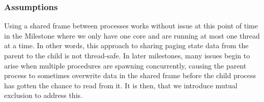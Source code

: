 \subsubsection{Assumptions}
Using a shared frame between processes works without issue at this point of time in the Milestone where we only have one core and are running at most one thread at a time. In other words, this approach to sharing paging state data from the parent to the child is not thread-safe. In later milestones, many issues begin to arise when multiple procedures are spawning concurrently, causing the parent process to sometimes overwrite data in the shared frame before the child process has gotten the chance to read from it. It is then, that we introduce mutual exclusion to address this.
